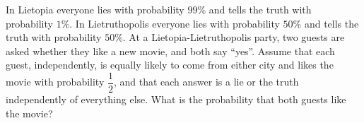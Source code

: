 In Lietopia everyone lies with probability $99\%$ and tells the truth with probability $1\%$. In Lietruthopolis everyone lies with probability $50\%$ and tells the truth with probability $50\%$. At a Lietopia-Lietruthopolis party, two guests are asked whether they like a new movie, and both say ``yes''. Assume that each guest, independently, is equally likely to come from either city and likes the movie with probability $\dfrac{1}{2}$, and that each answer is a lie or the truth independently of everything else. What is the probability that both guests like the movie?
